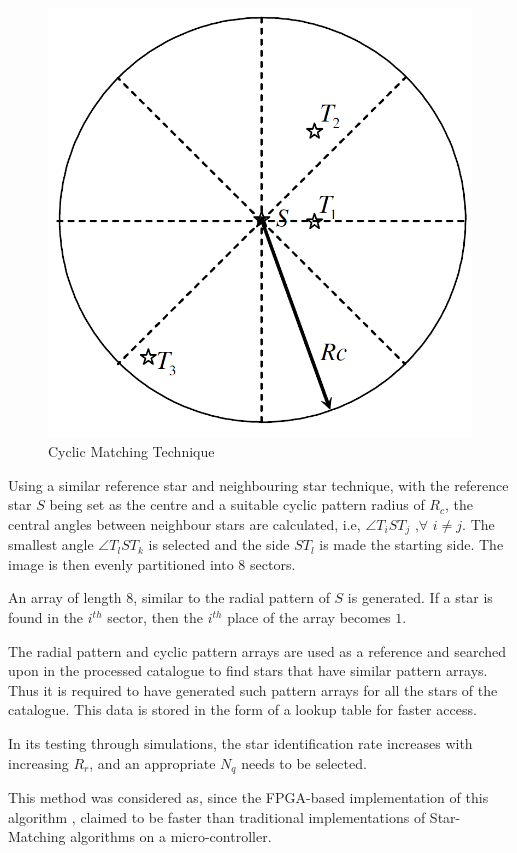 \begin{itemize}
    \begin{figure}[!h]
        \centering
        \includegraphics[scale=0.35]{Figures/GNC/cyclic_technique.PNG}
        \caption{Cyclic Matching Technique}
        \label{fig:cyclic}
    \end{figure}
    
    Using a similar reference star and neighbouring star technique, with the reference star $S$ being set as the centre and a suitable cyclic pattern radius of $R_c$, the central angles between neighbour stars are calculated, i.e, $\angle T_i S T_j$ ,$\forall$ $i\neq j$. The smallest angle $\angle T_l S T_k$ is selected and the side $ST_l$ is made the starting side. The image is then evenly partitioned into $8$ sectors. 
    
    An array of length $8$, similar to the radial pattern of $S$ is generated. If a star is found in the $i^{th}$ sector, then the $i^{th}$ place of the array becomes $1$.

\end{itemize}

The radial pattern and cyclic pattern arrays are used as a reference and searched upon in the processed catalogue to find stars that have similar pattern arrays. Thus it is required to have generated such pattern arrays for all the stars of the catalogue. This data is stored in the form of a lookup table for faster access.

In its testing through simulations, the star identification rate increases with increasing $R_r$, and an appropriate $N_q$ needs to be selected.

This method was considered as, since the FPGA-based implementation of this algorithm \cite{zhao2017real}, claimed to be faster than traditional implementations of Star-Matching algorithms on a micro-controller.